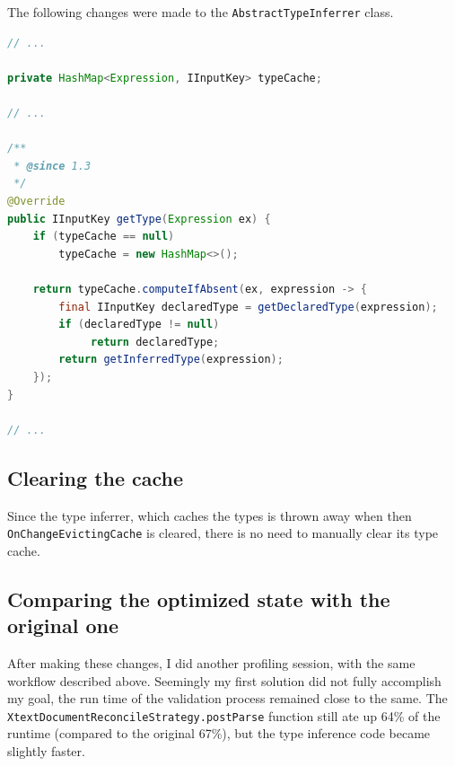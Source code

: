 \documentclass[11pt,a4paper,oneside]{report}
\begin{document}
The following changes were made to the \texttt{AbstractTypeInferrer} class.

\begin{lstlisting}[language=java]
// ...

private HashMap<Expression, IInputKey> typeCache;

// ...

/**
 * @since 1.3
 */
@Override
public IInputKey getType(Expression ex) {
    if (typeCache == null)
        typeCache = new HashMap<>();

    return typeCache.computeIfAbsent(ex, expression -> {
        final IInputKey declaredType = getDeclaredType(expression);
        if (declaredType != null)
             return declaredType;
        return getInferredType(expression);
    });
}

// ...
\end{lstlisting}

\subsection{Clearing the cache}
Since the type inferrer, which caches the types is thrown away when then
\texttt{OnChangeEvictingCache} is cleared, there is no need to manually clear
its type cache.

\subsection{Comparing the optimized state with the original one}
After making these changes, I did another profiling session, with the same
workflow described above. Seemingly my first solution did not fully accomplish
my goal, the run time of the validation process remained close to the same. The
\texttt{XtextDocumentReconcileStrategy.postParse} function still ate up 64\% of
the runtime (compared to the original 67\%), but the type inference code became
slightly faster.
\end{document}
